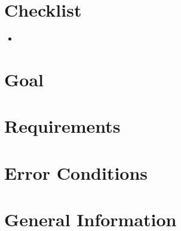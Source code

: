 \documentclass[12pt]{article}
\begin{document}
\section{Checklist}

\begin{itemize}
    \item
\end{itemize}

\section{Goal}

\section{Requirements}

\section{Error Conditions}

\section{General Information}
\end{document}
